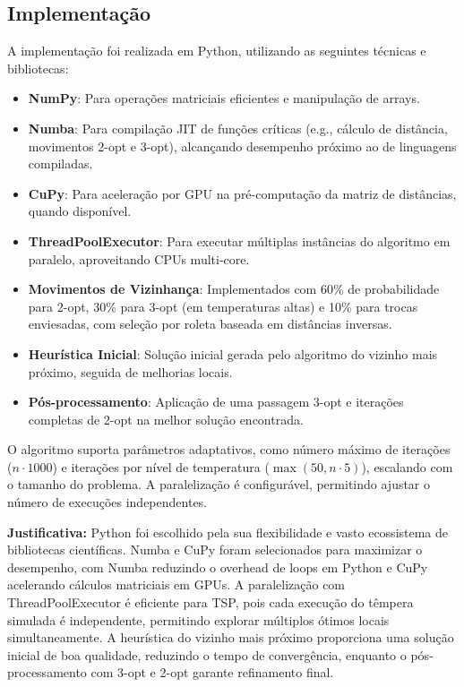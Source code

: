 \documentclass[11pt]{article}
\begin{document}
\subsection{Implementação}
A implementação foi realizada em Python, utilizando as seguintes técnicas e bibliotecas:
\begin{itemize}
    \item \textbf{NumPy}: Para operações matriciais eficientes e manipulação de arrays.
    \item \textbf{Numba}: Para compilação JIT de funções críticas (e.g., cálculo de distância, movimentos 2-opt e 3-opt), alcançando desempenho próximo ao de linguagens compiladas.
    \item \textbf{CuPy}: Para aceleração por GPU na pré-computação da matriz de distâncias, quando disponível.
    \item \textbf{ThreadPoolExecutor}: Para executar múltiplas instâncias do algoritmo em paralelo, aproveitando CPUs multi-core.
    \item \textbf{Movimentos de Vizinhança}: Implementados com 60\% de probabilidade para 2-opt, 30\% para 3-opt (em temperaturas altas) e 10\% para trocas enviesadas, com seleção por roleta baseada em distâncias inversas.
    \item \textbf{Heurística Inicial}: Solução inicial gerada pelo algoritmo do vizinho mais próximo, seguida de melhorias locais.
    \item \textbf{Pós-processamento}: Aplicação de uma passagem 3-opt e iterações completas de 2-opt na melhor solução encontrada.
\end{itemize}

O algoritmo suporta parâmetros adaptativos, como número máximo de iterações (\(n \cdot 1000\)) e iterações por nível de temperatura (\(\max\left(50, n \cdot 5\right)\)), escalando com o tamanho do problema. A paralelização é configurável, permitindo ajustar o número de execuções independentes.

\textbf{Justificativa:} Python foi escolhido pela sua flexibilidade e vasto ecossistema de bibliotecas científicas. Numba e CuPy foram selecionados para maximizar o desempenho, com Numba reduzindo o overhead de loops em Python e CuPy acelerando cálculos matriciais em GPUs. A paralelização com ThreadPoolExecutor é eficiente para TSP, pois cada execução do têmpera simulada é independente, permitindo explorar múltiplos ótimos locais simultaneamente. A heurística do vizinho mais próximo proporciona uma solução inicial de boa qualidade, reduzindo o tempo de convergência, enquanto o pós-processamento com 3-opt e 2-opt garante refinamento final.
\end{document}
